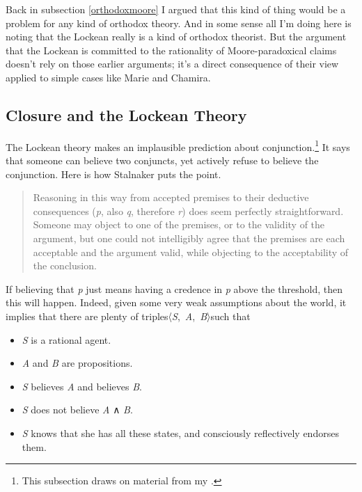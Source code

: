 \documentclass[
  11pt,
]{book}
\providecommand{\tightlist}{%
  \setlength{\itemsep}{0pt}\setlength{\parskip}{0pt}}
\begin{document}
Back in subsection \ref{orthodoxmoore} I argued that this kind of thing would be a problem for any kind of orthodox theory. And in some sense all I'm doing here is noting that the Lockean really is a kind of orthodox theorist. But the argument that the Lockean is committed to the rationality of Moore-paradoxical claims doesn't rely on those earlier arguments; it's a direct consequence of their view applied to simple cases like Marie and Chamira.

\hypertarget{closure}{%
\subsection{Closure and the Lockean Theory}\label{closure}}

The Lockean theory makes an implausible prediction about conjunction.\footnote{This subsection draws on material from my \citeyearpar{Weatherson2016}.} It says that someone can believe two conjuncts, yet actively refuse to believe the conjunction. Here is how Stalnaker puts the point.

\begin{quote}
Reasoning in this way from accepted premises to their deductive consequences (\emph{p}, also \emph{q}, therefore \emph{r}) does seem perfectly straightforward. Someone may object to one of the premises, or to the validity of the argument, but one could not intelligibly agree that the premises are each acceptable and the argument valid, while objecting to the acceptability of the conclusion. \citep[ 92]{Stalnaker1984}
\end{quote}

If believing that \emph{p} just means having a credence in \emph{p} above the threshold, then this will happen. Indeed, given some very weak assumptions about the world, it implies that there are plenty of triples〈\emph{S},~\emph{A},~\emph{B}〉such that

\begin{itemize}
\tightlist
\item
  \emph{S} is a rational agent.
\item
  \emph{A} and \emph{B} are propositions.
\item
  \emph{S} believes \emph{A} and believes \emph{B}.
\item
  \emph{S} does not believe \emph{A} ∧ \emph{B}.
\item
  \emph{S} knows that she has all these states, and consciously reflectively
  endorses them.
\end{itemize}
\end{document}
